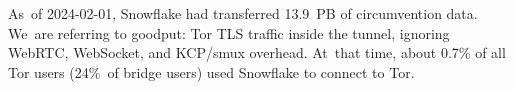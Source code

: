 \documentclass[letterpaper,twocolumn]{article}
\begin{document}
As~of \mbox{2024-02-01},
Snowflake had transferred 13.9~PB of circumvention data.
We~are referring to goodput: Tor TLS traffic inside the tunnel,
ignoring WebRTC, WebSocket, and KCP/\allowbreak smux overhead.
At~that time, about 0.7\% of all Tor users
(24\%~of bridge users) used Snowflake to connect to Tor.
\end{document}
